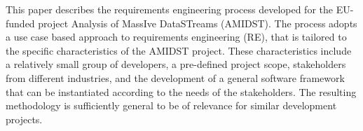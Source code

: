 
This paper describes the requirements engineering process developed for the EU-funded project  Analysis of MassIve DataSTreams (AMIDST). The process adopts a use case based approach to requirements engineering (RE), that is tailored to the specific characteristics of the AMIDST project. These characteristics include a relatively small group of developers, a pre-defined project scope, stakeholders from different industries, and the development of a general software framework that can be instantiated according to the needs of the stakeholders. The resulting methodology is sufficiently general to be of relevance for similar development projects.
